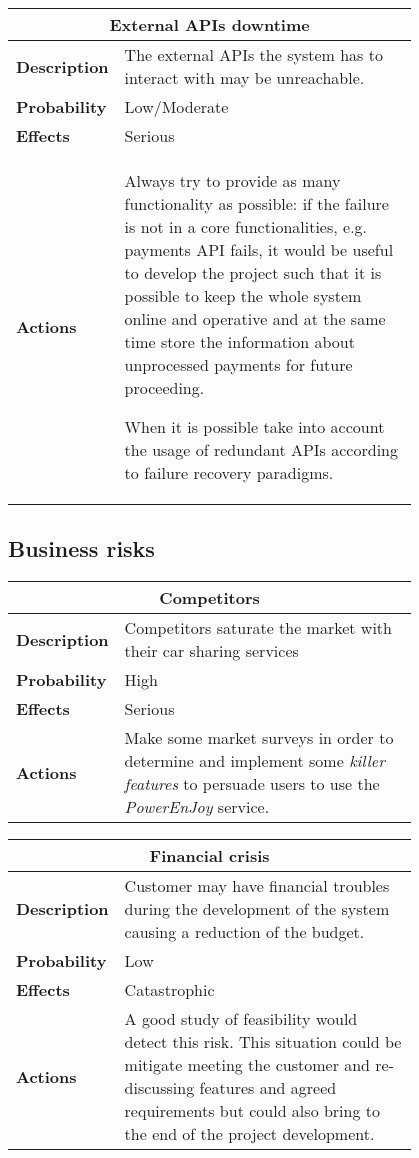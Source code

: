 \begin{longtable}{lp{0.8\linewidth}}
\multicolumn{2}{c}{\textbf{External APIs downtime}}\\
\toprule
\textbf{Description}& The external APIs the system has to interact with may be unreachable.\\
\midrule
\textbf{Probability}&Low/Moderate\\
\midrule
\textbf{Effects}&Serious\\
\midrule
\textbf{Actions}& Always try to provide as many functionality as possible: if the failure is not in a core functionalities, e.g. payments API fails, it would be useful to develop the project such that it is possible to keep the whole system online and operative and at the same time store the information about unprocessed payments for future proceeding.

When it is possible take into account the usage of redundant APIs according to failure recovery paradigms. \\
\bottomrule
\end{longtable}

\subsection{Business risks}
\begin{longtable}{lp{0.8\linewidth}}
\multicolumn{2}{c}{\textbf{Competitors}}\\
\toprule
\textbf{Description}&Competitors saturate the market with their car sharing services\\
\midrule
\textbf{Probability}&High\\
\midrule
\textbf{Effects}&Serious\\
\midrule
\textbf{Actions}&Make some market surveys in order to determine and implement some \emph{killer features} to persuade users to use the \emph{PowerEnJoy} service.\\
\bottomrule
\end{longtable}

\begin{longtable}{lp{0.8\linewidth}}
\multicolumn{2}{c}{\textbf{Financial crisis}}\\
\toprule
\textbf{Description}&Customer may have financial troubles during the development of the system causing a reduction of the budget.\\
\midrule
\textbf{Probability}&Low\\
\midrule
\textbf{Effects}&Catastrophic\\
\midrule
\textbf{Actions}& A good study of feasibility would detect this risk.  This situation could be mitigate meeting the customer and re-discussing features and agreed requirements but could also bring to the end of the project development. \\
\bottomrule
\end{longtable}

